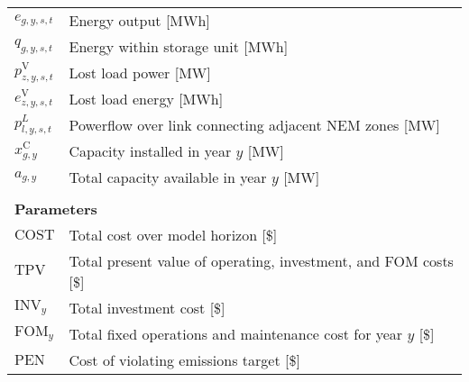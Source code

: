 \documentclass{article}
\newcommand{\sLinks}{L}
\newcommand{\iGenerator}{g}
\newcommand{\iYear}{y}
\newcommand{\iScenario}{s}
\newcommand{\iInterval}{t}
\newcommand{\iZone}{z}
\newcommand{\iRegion}{r}
\newcommand{\iLink}{l}
\newcommand{\cFixedOperationsMaintenanceCost}[1][\iYear]{\mathrm{FOM}_{#1}}
\newcommand{\cInvestmentCost}[1][\iYear]{\mathrm{INV}_{#1}}
\newcommand{\cTotalPresentValue}[1][]{\mathrm{TPV}_{#1}}
\newcommand{\cEmissionsViolationTotalCost}{\mathrm{PEN}}
\newcommand{\cObjectiveFunction}{\mathrm{COST}}
\newcommand{\vEnergy}[1][\iGenerator,\iYear,\iScenario,\iInterval]{e_{#1}}
\newcommand{\vInstalledCapacity}[1][\iGenerator,\iYear]{x^{\mathrm{C}}_{#1}}
\newcommand{\vReserveUp}[1][\iGenerator,\iYear,\iScenario,\iInterval]{r^{+}_{#1}}
\newcommand{\vReserveUpViolation}[1][\iRegion,\iYear,\iScenario,\iInterval]{r^{\mathrm{V}}_{#1}}
\newcommand{\vPowerIn}[1][\iGenerator,\iYear,\iScenario,\iInterval]{p^{\mathrm{in}}_{#1}}
\newcommand{\vPowerOut}[1][\iGenerator,\iYear,\iScenario,\iInterval]{p^{\mathrm{out}}_{#1}}
\newcommand{\vStorageUnitEnergy}[1][\iGenerator,\iYear,\iScenario,\iInterval]{q_{#1}}
\newcommand{\vPowerFlow}[1][\iLink,\iYear,\iScenario,\iInterval]{p^{\sLinks}_{#1}}
\newcommand{\vLostLoadEnergy}[1][\iZone,\iYear,\iScenario,\iInterval]{e^{\mathrm{V}}_{#1}}
\newcommand{\vLostLoadPower}[1][\iZone,\iYear,\iScenario,\iInterval]{p^{\mathrm{V}}_{#1}}
\newcommand{\vEmissionsTargetViolation}{f^{\mathrm{E}}}
\newcommand{\vInstalledCapacityTotal}[1][\iGenerator,\iYear]{a_{#1}}
\begin{document}
\begin{longtable}{ p{}  p{}}
		$\vEnergy$ & Energy output [MWh]\\
		$\vStorageUnitEnergy$ & Energy within storage unit [MWh]\\
		$\vLostLoadPower$ & Lost load power [MW]\\
		$\vLostLoadEnergy$ & Lost load energy [MWh]\\
		$\vPowerFlow$ & Powerflow over link connecting adjacent NEM zones [MW]\\
		$\vInstalledCapacity$ & Capacity installed in year $\iYear$ [MW]\\
		$\vInstalledCapacityTotal$ & Total capacity available in year $\iYear$ [MW]\\
		& \\
		\multicolumn{2}{l}{\textbf{Parameters}}\\
		$\cObjectiveFunction$ & Total cost over model horizon [\$]\\
		$\cTotalPresentValue$ & Total present value of operating, investment, and FOM costs [\$]\\
		$\cInvestmentCost$ & Total investment cost [\$]\\
		$\cFixedOperationsMaintenanceCost$ & Total fixed operations and maintenance cost for year $\iYear$ [\$]\\
		$\cEmissionsViolationTotalCost$ & Cost of violating emissions target [\$]\\

\end{longtable}
\end{document}
